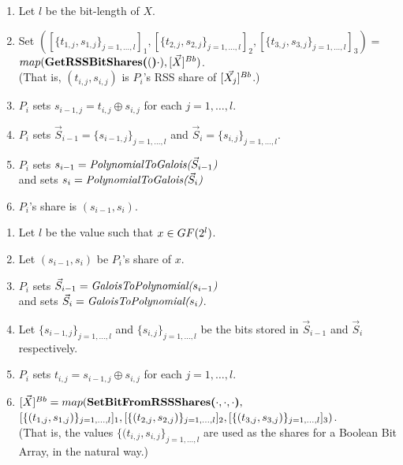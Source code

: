 \begin{protocol}
	\begin{enumerate}
		\item Let $l$ be the bit-length of $X$.
		\item Set $([\{t_{1,j}, s_{1,j}\}_{j=1, \ldots, l}]_1,
			[\{t_{2,j}, s_{2,j}\}_{j=1, \ldots, l}]_2,
			[\{t_{3,j}, s_{3,j}\}_{j=1, \ldots, l}]_3)
			= $\\$map(\textbf{GetRSSBitShares(}(\textbf{)}\cdot), [\vec{X}]^{Bb})$.\\
			(That is, $(t_{i,j}, s_{i,j})$ is $P_i$'s
			RSS share of $[\vec{X_j}]^{Bb}$.)
		\item $P_i$ sets $s_{i-1,j} = t_{i,j} \oplus s_{i,j}$
			for each $j=1,\ldots,l$.
		\item $P_i$ sets $\vec{S}_{i-1} = \{s_{i-1, j}\}_{j=1, \ldots, l}$
			and $\vec{S}_i = \{s_{i, j}\}_{j=1, \ldots, l}$.
		\item $P_i$ sets $s_{i-1} = \textit{PolynomialToGalois(}\vec{S}_{i-1}\textit{)}$ \\
			and sets $s_i = \textit{PolynomialToGalois(}\vec{S}_i\textit{)}$
		\item $P_i$'s share is $(s_{i-1}, s_i)$.
	\end{enumerate}

\noindent {}
	\begin{enumerate}
		\item Let $l$ be the value such that $x \in GF(2^l)$.
		\item Let $(s_{i-1}, s_i)$ be $P_i$'s share of $x$.
		\item $P_i$ sets $\vec{S}_{i-1} = \textit{GaloisToPolynomial(}s_{i-1}\textit{)}$ \\
			and sets $\vec{S}_i = \textit{GaloisToPolynomial(}s_i\textit{)}$.
		\item Let $\{s_{i-1,j}\}_{j=1,\ldots,l}$ and
			$\{s_{i,j}\}_{j=1,\ldots,l}$ be the
			bits stored in $\vec{S}_{i-1}$ 
			and $\vec{S}_i$ respectively.
		\item $P_i$ sets $t_{i,j} = s_{i-1,j} \oplus s_{i,j}$
			for each $j=1,\ldots,l$.
		\item $[\vec{X}]^{Bb} =  map(\textbf{SetBitFromRSSShares(}\cdot, \cdot, \cdot\textbf{)},$\\
			$[\{(t_{1,j}, s_{1,j})\}_{j=1,\ldots,l}]_{1},
			[\{(t_{2,j}, s_{2,j})\}_{j=1,\ldots,l}]_{2},
			[\{(t_{3,j}, s_{3,j})\}_{j=1,\ldots,l}]_{3})$. \\
			(That is, the values $\{(t_{i,j}, s_{i,j}\}_{j=1,\ldots,l}$ are used
			as the shares for a Boolean Bit Array, in the natural way.)
	\end{enumerate}

\end{protocol}

